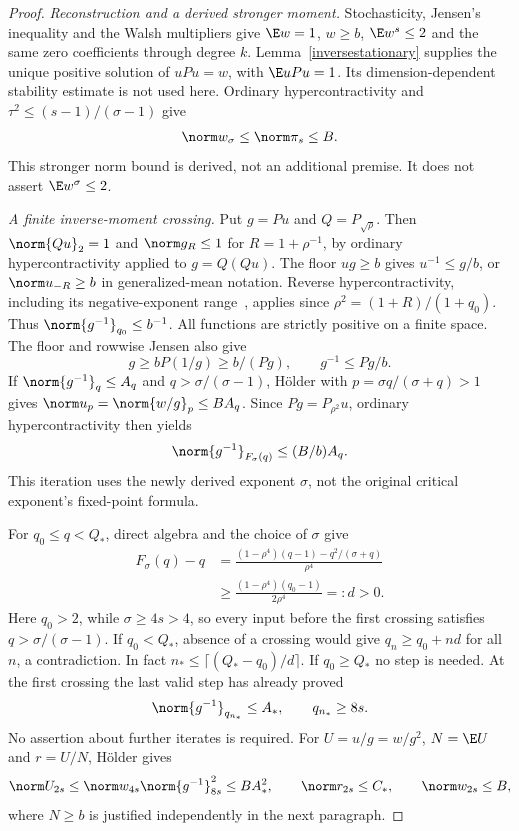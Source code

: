 \begin{proof}
\emph{Reconstruction and a derived stronger moment.}
Stochasticity, Jensen's inequality and the Walsh multipliers give
$\E w=1$, $w\geq b$, $\E w^s\leq2$ and the same zero coefficients
through degree $k$. Lemma~\ref{inversestationary} supplies the unique
positive solution of $uPu=w$, with $\E uPu=1$. Its dimension-dependent
stability estimate is not used here. Ordinary hypercontractivity
\cite{mos,odonnell} and $\tau^2\leq(s-1)/(\sigma-1)$ give
\begin{equation}\label{densityhighermoment}
 \norm w_\sigma\leq\norm\pi_s\leq B.
\end{equation}
This stronger norm bound is derived, not an additional premise. It does
not assert $\E w^\sigma\leq2$.

\emph{A finite inverse-moment crossing.}
Put $g=Pu$ and $Q=P_{\sqrt\rho}$. Then $\norm{Qu}_2=1$ and
$\norm g_R\leq1$ for $R=1+\rho^{-1}$, by ordinary
hypercontractivity applied to $g=Q(Qu)$. The floor $ug\geq b$ gives
$u^{-1}\leq g/b$, or $\norm u_{-R}\geq b$ in generalized-mean
notation. Reverse hypercontractivity, including its negative-exponent
range~\cite{mos}, applies since
$\rho^2=(1+R)/(1+q_0)$. Thus
$\norm{g^{-1}}_{q_0}\leq b^{-1}$.
All functions are strictly positive on a finite space.
The floor and rowwise Jensen also give
\[
 g\geq bP(1/g)\geq b/(Pg),\qquad g^{-1}\leq Pg/b.
\]
If $\norm{g^{-1}}_q\leq A_q$ and $q>\sigma/(\sigma-1)$,
H\"older with $p=\sigma q/(\sigma+q)>1$ gives
$\norm u_p=\norm{w/g}_p\leq BA_q$.
Since $Pg=P_{\rho^2}u$, ordinary hypercontractivity then yields
\begin{equation}\label{densitybootstrap}
 \norm{g^{-1}}_{F_\sigma(q)}\leq(B/b)A_q.
\end{equation}
This iteration uses the newly derived exponent $\sigma$, not the original
critical exponent's fixed-point formula.

For $q_0\leq q<Q_*$, direct algebra and the choice of $\sigma$ give
\begin{align*}
 F_\sigma(q)-q
 &=\frac{(1-\rho^4)(q-1)-q^2/(\sigma+q)}{\rho^4}\\
 &\geq\frac{(1-\rho^4)(q_0-1)}{2\rho^4}=:d>0.
\end{align*}
Here $q_0>2$, while $\sigma\geq4s>4$, so every input before the
first crossing satisfies $q>\sigma/(\sigma-1)$. If $q_0<Q_*$, absence
of a crossing would give $q_n\geq q_0+nd$ for all $n$, a contradiction.
In fact $n_*\leq\lceil(Q_*-q_0)/d\rceil$. If $q_0\geq Q_*$ no
step is needed. At the first crossing the last valid step has already
proved
\[
 \norm{g^{-1}}_{q_{n_*}}\leq A_*,\qquad q_{n_*}\geq8s.
\]
No assertion about further iterates is required.
For $U=u/g=w/g^2$, $N=\E U$ and $r=U/N$, H\"older gives
\begin{equation}\label{densityratiomoment}
 \norm U_{2s}\leq\norm w_{4s}\norm{g^{-1}}_{8s}^2
       \leq BA_*^2,\qquad \norm r_{2s}\leq C_*,
       \qquad \norm w_{2s}\leq B,
\end{equation}
where $N\geq b$ is justified independently in the next paragraph.


\end{proof}
